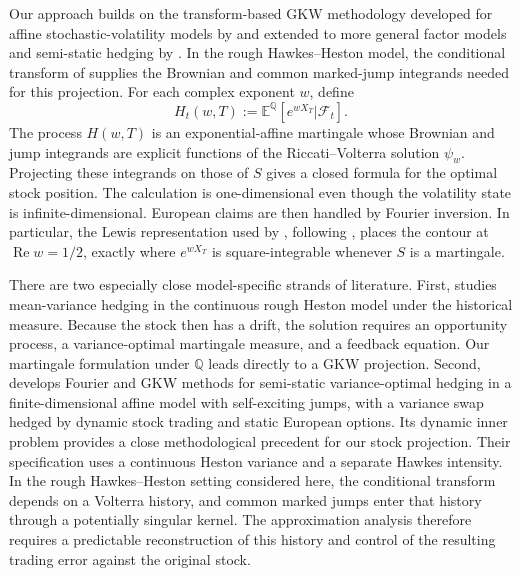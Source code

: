 \documentclass[11pt]{article}
\theoremstyle{definition}
\theoremstyle{remark}
\newcommand{\E}{\mathbb{E}}
\newcommand{\Q}{\mathbb{Q}}
\newcommand{\F}{\mathcal{F}}
\newcommand{\1}{\mathbf{1}}
\begin{document}
Our approach builds on the transform-based GKW methodology developed for
affine stochastic-volatility models by \citet{kallsenpauwels2010} and extended
to more general factor models and semi-static hedging by
\citet{ditellahauboldkellerressel2019}. In the rough Hawkes--Heston model,
the conditional transform of \citet{bondi2024} supplies the Brownian and
common marked-jump integrands needed for this projection. For each complex
exponent $w$, define
\[
 H_t(w,T):=\E^{\Q}[e^{wX_T}|\F_t].
\]
The process $H(w,T)$ is an exponential-affine martingale whose Brownian and
jump integrands are explicit functions of the Riccati--Volterra solution
$\psi_w$. Projecting these integrands on those of $S$ gives a closed formula
for the optimal stock position. The calculation is one-dimensional even
though the volatility state is infinite-dimensional. European claims are then
handled by Fourier inversion. In particular, the Lewis representation used by
\citet{bondi2024}, following \citet{lewis2001}, places the contour at
$\operatorname{Re}w=1/2$, exactly where
$e^{wX_T}$ is square-integrable whenever $S$ is a martingale.

There are two especially close model-specific strands of literature. First,
\citet{martins2023thesis} studies mean-variance hedging in the continuous rough
Heston model under the historical measure. Because the stock then has a drift,
the solution requires an opportunity process, a variance-optimal martingale
measure, and a feedback equation. Our martingale formulation under $\Q$
leads directly to a GKW projection. Second,
\citet{callegaro2025semistatic} develops Fourier and GKW methods for
semi-static variance-optimal hedging in a finite-dimensional affine model
with self-exciting jumps, with a variance swap hedged by dynamic stock
trading and static European options. Its dynamic inner problem provides a
close methodological precedent for our stock projection. Their specification
uses a continuous Heston variance and a separate Hawkes intensity. In the
rough Hawkes--Heston setting considered here, the conditional transform depends
on a Volterra history, and common marked jumps enter that history through
a potentially singular kernel. The approximation analysis therefore
requires a predictable reconstruction of this history and control of the
resulting trading error against the original stock.
\end{document}
